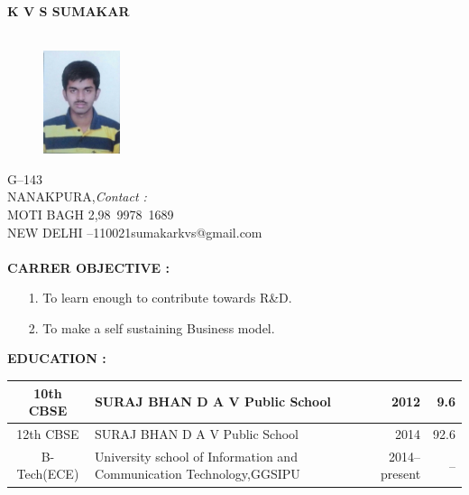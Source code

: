 \documentclass{article}
\begin{document}
	\begin{center}
		\textbf{K V S SUMAKAR}\\
		\hrulefill\\
		
	\end{center}
	\begin{figure}[h]
		\centering
	\includegraphics[width=0.2\textwidth]{IMG-20160524-WA0002}
	
	\end{figure}
	G--143\\ 
	NANAKPURA,\hfill \textsl{Contact :}\\
	MOTI BAGH 2,\hfill \mbox{98 9978 1689}\\
	NEW DELHI --\mbox{110021}\hfill \mbox{sumakarkvs@gmail.com}\\
	\\
	
	\textbf{CARRER OBJECTIVE :}
	\begin{itemize}
\item[1.] 	To learn enough to contribute towards R\&D.
\item[2.]	To make a self sustaining Business model.\\
	\end{itemize}
	

	\textbf{EDUCATION :\\}

	\begin{tabular}{|c|p{60 mm}|r|r|}
 \hline
		 10th CBSE  &                    SURAJ BHAN D A V Public School                    &            2012 &             9.6 \\ \hline
		 12th CBSE  &                    SURAJ BHAN D A V Public School                    &            2014 &            92.6 \\ \hline
		B-Tech(ECE) & University school of Information and Communication Technology,GGSIPU &   2014--present &              -- \\ \hline
	\end{tabular}
	\\
	\\
\end{document}
